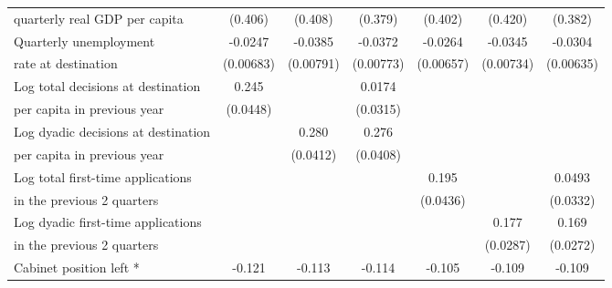 \begin{table}[!ht]
\begin{tabular}{l*{6}{c}}
 quarterly real GDP per capita                    &     (0.406)         &     (0.408)         &     (0.379)         &     (0.402)         &     (0.420)         &     (0.382)         \\
[0,5em]
Quarterly unemployment&     -0.0247\sym{***}&     -0.0385\sym{***}&     -0.0372\sym{***}&     -0.0264\sym{***}&     -0.0345\sym{***}&     -0.0304\sym{***}\\
 rate at destination                    &   (0.00683)         &   (0.00791)         &   (0.00773)         &   (0.00657)         &   (0.00734)         &   (0.00635)         \\
[0,5em]
Log total decisions at destination&       0.245\sym{***}&                     &      0.0174         &                     &                     &                     \\
 per capita in previous year                    &    (0.0448)         &                     &    (0.0315)         &                     &                     &                     \\
[0,5em]
Log dyadic decisions at destination&                     &       0.280\sym{***}&       0.276\sym{***}&                     &                     &                     \\
  per capita in previous year                   &                     &    (0.0412)         &    (0.0408)         &                     &                     &                     \\
[0,5em]
Log total first-time applications&                     &                     &                     &       0.195\sym{***}&                     &      0.0493         \\
 in the previous 2 quarters                    &                     &                     &                     &    (0.0436)         &                     &    (0.0332)         \\
[0,5em]
Log dyadic first-time applications&                     &                     &                     &                     &       0.177\sym{***}&       0.169\sym{***}\\
 in the previous 2 quarters                    &                     &                     &                     &                     &    (0.0287)         &    (0.0272)         \\
[0,5em]
Cabinet position left * &      -0.121\sym{***}&      -0.113\sym{***}&      -0.114\sym{***}&      -0.105\sym{***}&      -0.109\sym{***}&      -0.109\sym{***}\\

\end{tabular}
\end{table}
